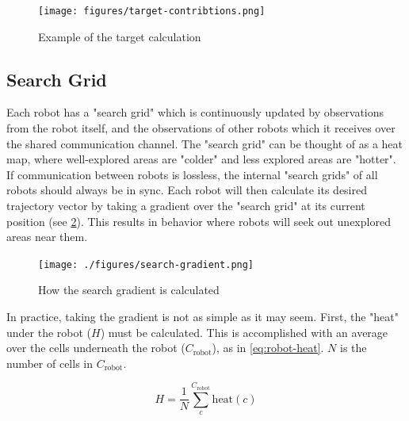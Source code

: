 \begin{figure}[H]
    \begin{center}
        \texttt{[image: figures/target-contribtions.png]}
    \end{center}
    \caption{Example of the target calculation}
    \label{fig:target-contributions}
\end{figure}



\subsection{Search Grid}

Each robot has a "search grid" which is continuously updated by observations from the robot itself, and the observations of other robots which it receives over the shared communication channel. The "search grid" can be thought of as a heat map, where well-explored areas are "colder" and less explored areas are "hotter". If communication between robots is lossless, the internal "search grids" of all robots should always be in sync. Each robot will then calculate its desired trajectory vector by taking a gradient over the "search grid" at its current position (see \cref{fig:search-gradient}). This results in behavior where robots will seek out unexplored areas near them. \\
\begin{figure}[h]
    \begin{center}
        \texttt{[image: ./figures/search-gradient.png]}
    \end{center}
    \caption{How the search gradient is calculated}
    \label{fig:search-gradient}
\end{figure}


In practice, taking the gradient is not as simple as it may seem. First, the "heat" under the robot ($H$) must be calculated. This is accomplished with an average over the cells underneath the robot ($C_\mathrm{robot}$), as in \cref{eq:robot-heat}. $N$ is the number of cells in $C_\mathrm{robot}$.

\begin{equation}
\label{eq:robot-heat}
    H = \frac{1}{N} \sum_c^{C_\mathrm{robot}} \mathrm{heat}(c)
\end{equation}

